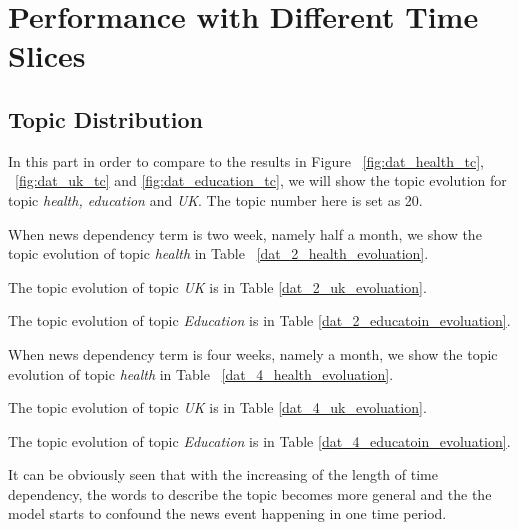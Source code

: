 \section{Performance with Different Time Slices}


\subsection{Topic Distribution}
In this part in order to compare to the results in Figure ~\ref{fig:dat_health_tc}, ~\ref{fig:dat_uk_tc} and \ref{fig:dat_education_tc}, we will show the topic evolution for topic \textit{health, education} and \textit{UK}. The topic number here is set as 20. 

When news dependency term is two week, namely half a month, we show the topic evolution of topic \textit{health} in Table ~\ref{dat_2_health_evoluation}.

The topic evolution of topic \textit{UK} is in Table \ref{dat_2_uk_evoluation}. 

The topic evolution of topic \textit{Education} is in Table \ref{dat_2_educatoin_evoluation}.

When news dependency term is four weeks, namely a month, we show the topic evolution of topic \textit{health} in Table ~\ref{dat_4_health_evoluation}.

The topic evolution of topic \textit{UK} is in Table \ref{dat_4_uk_evoluation}. 

The topic evolution of topic \textit{Education} is in Table \ref{dat_4_educatoin_evoluation}.

It can be obviously seen that with the increasing of the length of time dependency, the words to describe the topic becomes more general and the the model starts to confound the news event happening in one time period.

